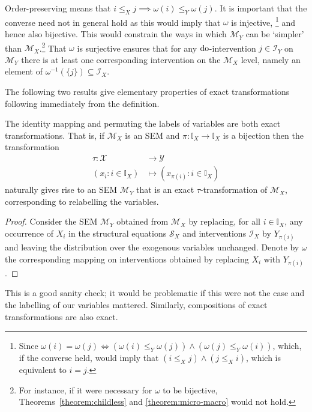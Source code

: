 Order-preserving means that ${i \leq_X j \implies \omega(i) \leq_Y \omega(j)}$.
It is important that the converse need not in general hold as this would imply that $\omega$ is injective,%
\footnote{Since ${\omega(i)=\omega(j) \iff \left(\omega(i) \leq_Y \omega(j)\right) \land \left(\omega(j) \leq_Y \omega(i)\right)}$, which, if the converse held, would imply that $\left(i \leq_X j\right) \land \left(j \leq_X i\right)$, which is equivalent to $i=j$.}
and hence also bijective.
This would constrain the ways in which $\mathcal{M}_Y$ can be `simpler' than $\mathcal{M}_X$.\footnote{For instance, if it were necessary for $\omega$ to be bijective, Theorems~\ref{theorem:childless} and \ref{theorem:micro-macro} would not hold.}
That $\omega$ is surjective ensures that for any $\operatorname{do}$-intervention $j \in \mathcal{I}_Y$ on $\mathcal{M}_Y$ there is at least one corresponding intervention on the $\mathcal{M}_X$ level, namely an element of $\omega^{-1}(\{j\}) \subseteq \mathcal{I}_X$.

The following two results give elementary properties of exact transformations following immediately from the definition.
\medskip

\begin{lemma}\label{lemma:elementary}
The identity mapping and permuting the labels of variables are both exact transformations.
That is, if $\mathcal{M}_X$ is an SEM and $\pi:\mathbb{I}_X \to \mathbb{I}_X$ is a bijection then the transformation
\begin{align*}
\tau:\mathcal{X}&\to\mathcal{Y}\\
(x_i:i\in\mathbb{I}_X) &\mapsto (x_{\pi(i)}:i\in\mathbb{I}_X)
\end{align*}
naturally gives rise to an SEM $\mathcal{M}_Y$ that is an exact $\tau$-transformation of $\mathcal{M}_X$, corresponding to relabelling the variables.
\end{lemma}

\begin{proof}
Consider the SEM $\mathcal{M}_Y$ obtained from $\mathcal{M}_X$ by replacing, for all $i\in\mathbb{I}_X$, any occurrence of $X_i$ in the structural equations $\mathcal{S}_X$ and interventions $\mathcal{I}_X$ by $Y_{\pi(i)}$ and leaving the distribution over the exogenous variables unchanged. Denote by $\omega$ the corresponding mapping on interventions obtained by replacing $X_i$ with $Y_{\pi(i)}$.
\end{proof}

This is a good sanity check; it would be problematic if this were not the case and the labelling of our variables mattered. Similarly, compositions of exact transformations are also exact.

